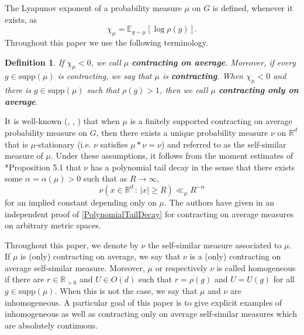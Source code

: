 \documentclass[10pt, english,oneside,reqno]{amsart}
\theoremstyle{plain}
\newtheorem{definition}[theorem]{Definition}
\theoremstyle{remark}
\numberwithin{equation}{section}
\numberwithin{figure}{section}
\newcommand{\R}{\mathbb{R}}
\newcommand{\E}{\mathbb{E}}
\begin{document}
    The Lyapunov exponent of a probability measure $\mu$ on $G$ is defined, whenever it exists, as $$\chi_{\mu} = \E_{g\sim\mu}[\log \rho(g)].$$ Throughout this paper we use the following terminology.  

    \begin{definition}
        If $\chi_{\mu} < 0$, we call $\mu$ \textbf{contracting on average}. Moreover, if every $g\in \mathrm{supp}(\mu)$ is contracting, we say that $\mu$ is \textbf{contracting}. When $\chi_{\mu} < 0$ and there is $g \in \mathrm{supp}(\mu)$ such that $\rho(g) > 1$, then we call $\mu$ \textbf{contracting only on average}.
    \end{definition}
    
    It is well-known (\cite{Hutchinson1981}, \cite{BarnsleyElton1988}, \cite{BougerolPicard1992}) that when $\mu$ is a finitely supported contracting on average probability measure on $G$, then there exists a unique probability measure $\nu$ on $\R^d$ that is $\mu$-stationary (i.e. $\nu$ satisfies $\mu * \nu = \nu$) and referred to as the self-similar measure of $\mu$. Under these assumptions, it follows from the moment estimates of \cite{GuivarchLePage2016}*{Proposition 5.1} that $\nu$ has a polynomial tail decay in the sense that there exists some $\alpha = \alpha(\mu) > 0$ such that as $R \to \infty$,
    \begin{equation}\label{PolynomialTailDecay}
        \nu(x \in \R^d \,:\, |x| \geq R) \ll_{\mu} R^{-\alpha}
    \end{equation}
    for an implied constant depending only on $\mu$. The authors have given in \cite{KittleKoglerTail} an independent proof of \eqref{PolynomialTailDecay} for contracting on average measures on arbitrary metric spaces. 
    
    Throughout this paper, we denote by $\nu$ the self-similar measure associated to $\mu$. If $\mu$ is (only) contracting on average, we say that $\nu$ is a (only) contracting on average self-similar measure. Moreover, $\mu$ or respectively $\nu$ is called homogeneous if there are $r \in \R_{>0}$ and $U\in O(d)$ such that $r = \rho(g)$ and $U = U(g)$ for all $g \in \mathrm{supp}(\mu)$. When this is not the case, we say that $\mu$ and $\nu$ are inhomogeneous. A particular goal of this paper is to give explicit examples of inhomogeneous as well as contracting only on average self-similar measures which are absolutely continuous.
\end{document}
